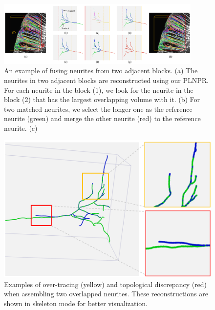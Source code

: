
\begin{figure}[t]
	\centering
	\includegraphics[width=0.9\textwidth]{./Illustrations/fusion_algorithm.png}
	\caption{An example of fusing neurites from two adjacent blocks.  (a) The neurites in two adjacent blocks are reconstructed using our PLNPR. For each neurite in the block (1), we look for the neurite in the block (2) that has the largest overlapping volume with it. (b) For two matched neurites, we select the longer one as the reference neurite (green) and merge the other neurite (red) to the reference neurite. (c) }
	\label{fig:fusion_algorithm}
\end{figure}

\begin{figure}[th]
	\centering
	\includegraphics[width=1\columnwidth]{./Illustrations/neuorns_fusion6.png}
	\caption{Examples of over-tracing (yellow) and topological discrepancy (red) when assembling two overlapped neurites. These reconstructions are shown in skeleton mode for better visualization.}
	\label{fig:overlap_discrepancy}
\end{figure}

